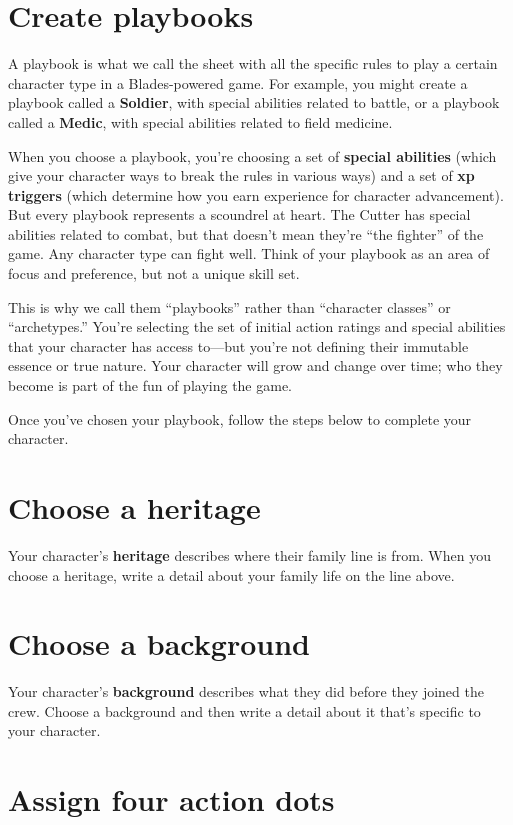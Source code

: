 \documentclass[11pt,oneside]{book}
\begin{document}
\section{Create playbooks}

A playbook is what we call the sheet with all the specific rules to play a certain character type in a Blades-powered game. For example, you might create a playbook called a \textbf{Soldier}, with special abilities related to battle, or a playbook called a \textbf{Medic}, with special abilities related to field medicine.

When you choose a playbook, you’re choosing a set of \textbf{special abilities} (which give your character ways to break the rules in various ways) and a set of \textbf{xp triggers} (which determine how you earn experience for character advancement). But every playbook represents a scoundrel at heart. The Cutter has special abilities related to combat, but that doesn’t mean they’re “the fighter” of the game. Any character type can fight well. Think of your playbook as an area of focus and preference, but not a unique skill set.

This is why we call them “playbooks” rather than “character classes” or “archetypes.” You’re selecting the set of initial action ratings and special abilities that your character has access to---but you’re not defining their immutable essence or true nature. Your character will grow and change over time; who they become is part of the fun of playing the game.

Once you’ve chosen your playbook, follow the steps below to complete your character.

\section{Choose a heritage}

Your character’s \textbf{heritage} describes where their family line is from. When you choose a heritage, write a detail about your family life on the line above.

\section{Choose a background}

Your character’s \textbf{background} describes what they did before they joined the crew. Choose a background and then write a detail about it that’s specific to your character.

\section{Assign four action dots}
\end{document}

